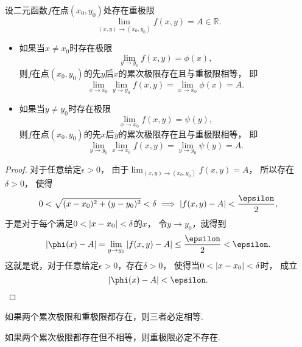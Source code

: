 \begin{theorem}\label{theorem:重极限.二元函数的重极限与累次极限的关系}
设二元函数\(f\)在点\((x_0,y_0)\)处存在重极限\[
	\lim_{(x,y)\to(x_0,y_0)} f(x,y) = A \in \mathbb{R}.
\]\begin{itemize}%
	\item 如果当\(x \neq x_0\)时存在极限\[
		\lim_{y \to y_0} f(x,y)
		= \phi(x),
	\]
	则\(f\)在点\((x_0,y_0)\)的先\(y\)后\(x\)的累次极限存在且与重极限相等，
	即\[
		\lim_{x \to x_0} \lim_{y \to y_0} f(x,y)
		= \lim_{x \to x_0} \phi(x)
		= A.
	\]

	\item 如果当\(y \neq y_0\)时存在极限\[
		\lim_{x \to x_0} f(x,y)
		= \psi(y),
	\]
	则\(f\)在点\((x_0,y_0)\)的先\(x\)后\(y\)的累次极限存在且与重极限相等，
	即\[
		\lim_{y \to y_0} \lim_{x \to x_0} f(x,y)
		= \lim_{y \to y_0} \psi(y)
		= A.
	\]
\end{itemize}
\begin{proof}
对于任意给定\(\epsilon>0\)，
由于\(\lim_{(x,y)\to(x_0,y_0)} f(x,y) = A\)，
所以存在\(\delta>0\)，
使得\[
	0<\sqrt{(x-x_0)^2+(y-y_0)^2}<\delta
	\implies
	\abs{f(x,y)-A}<\frac\epsilon2,
\]
于是对于每个满足\(0<\abs{x-x_0}<\delta\)的\(x\)，
令\(y \to y_0\)，就得到\[
	\abs{\phi(x)-A}
	= \lim_{y \to y_0} \abs{f(x,y)-A}
	\leq \frac\epsilon2
	< \epsilon.
\]
这就是说，对于任意给定\(\epsilon>0\)，存在\(\delta>0\)，
使得当\(0<\abs{x-x_0}<\delta\)时，
成立\[
	\abs{\phi(x)-A} < \epsilon.
	\qedhere
\]
\end{proof}
\end{theorem}

\begin{corollary}
如果两个累次极限和重极限都存在，则三者必定相等.
\end{corollary}

\begin{corollary}
如果两个累次极限都存在但不相等，则重极限必定不存在.
\end{corollary}
